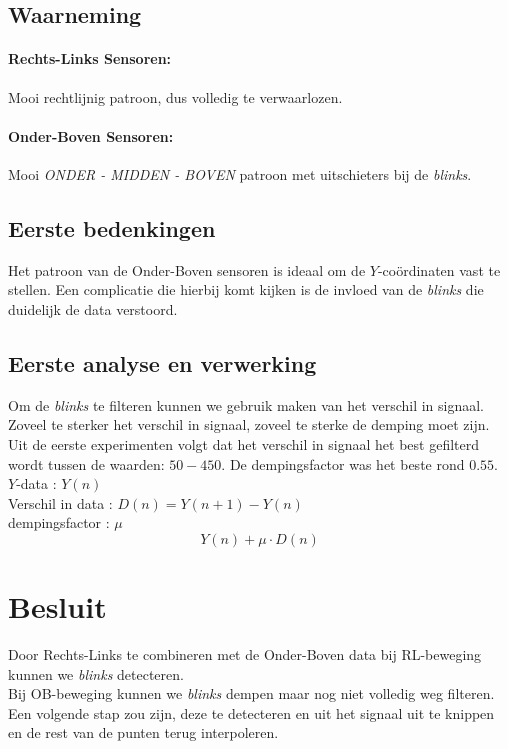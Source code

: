 \documentclass[12pt,a4paper]{article}
\begin{document}
			\subsection{Waarneming}
				\paragraph{Rechts-Links Sensoren:}
					Mooi rechtlijnig patroon, dus volledig te verwaarlozen.\\
				\paragraph{Onder-Boven Sensoren:}
					Mooi \textit{ONDER - MIDDEN - BOVEN} patroon met uitschieters bij de \textit{blinks}.
			\subsection{Eerste bedenkingen}
				Het patroon van de Onder-Boven sensoren is ideaal om de $Y$-coördinaten vast te stellen. Een complicatie die hierbij komt kijken is de invloed van de \textit{blinks} die duidelijk de data verstoord.
			\subsection{Eerste analyse en verwerking}
				Om de \textit{blinks} te filteren kunnen we gebruik maken van het verschil in signaal. Zoveel te sterker het verschil in signaal, zoveel te sterke de demping moet zijn. Uit de eerste experimenten volgt dat het verschil in signaal het best gefilterd wordt tussen de waarden: $50 - 450$. De dempingsfactor was het beste rond $0.55$.\\
				
				$Y$-data : $Y(n)$\\
				Verschil in data : $D(n) = Y(n+1)-Y(n)$\\
				dempingsfactor : $\mu$\\
				$$Y(n)+\mu\cdot D(n)$$
		\section{Besluit}
		Door Rechts-Links te combineren met de Onder-Boven data bij RL-beweging kunnen we \textit{blinks} detecteren.\\
		
		Bij OB-beweging kunnen we \textit{blinks} dempen maar nog niet volledig weg filteren. Een volgende stap zou zijn, deze te detecteren en uit het signaal uit te knippen en de rest van de punten terug interpoleren.
\end{document}
